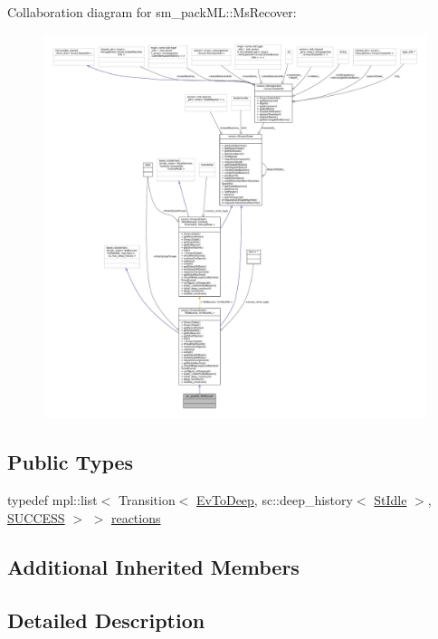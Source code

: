 Collaboration diagram for sm\+\_\+pack\+ML\+:\+:Ms\+Recover\+:
\nopagebreak
\begin{figure}[H]
\begin{center}
\leavevmode
\includegraphics[width=350pt]{classsm__packML_1_1MsRecover__coll__graph}
\end{center}
\end{figure}
\subsection*{Public Types}
\begin{DoxyCompactItemize}
\item 
typedef mpl\+::list$<$ Transition$<$ \hyperlink{structsm__packML_1_1EvToDeep}{Ev\+To\+Deep}, sc\+::deep\+\_\+history$<$ \hyperlink{structsm__packML_1_1StIdle}{St\+Idle} $>$, \hyperlink{classSUCCESS}{S\+U\+C\+C\+E\+SS} $>$ $>$ \hyperlink{classsm__packML_1_1MsRecover_a8bffec774dd169681986307bed44350c}{reactions}
\end{DoxyCompactItemize}
\subsection*{Additional Inherited Members}


\subsection{Detailed Description}


